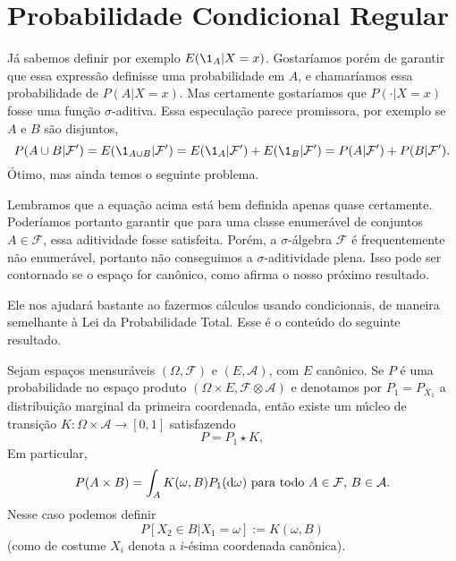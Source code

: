 \section{Probabilidade Condicional Regular}

Já sabemos definir por exemplo $E(\1_A|X = x)$.
Gostaríamos porém de garantir que essa expressão definisse uma probabilidade em $A$, e chamaríamos essa probabilidade de $P(A|X = x)$.
Mas certamente gostaríamos que $P(\cdot|X = x)$ fosse uma função $\sigma$-aditiva.
Essa especulação parece promissora, por exemplo se $A$ e $B$ são disjuntos,
\begin{equation*}
  P(A \cup B |\mathcal{F}') = E(\1_{A \cup B} | \mathcal{F}') = E(\1_A|\mathcal{F}') + E(\1_{B}|\mathcal{F}') = P(A|\mathcal{F}') + P(B|\mathcal{F}').
\end{equation*}
Ótimo, mas ainda temos o seguinte problema.

Lembramos que a equação acima está bem definida apenas quase certamente.
Poderíamos portanto garantir que para uma classe enumerável de conjuntos $A \in \mathcal{F}$, essa aditividade fosse satisfeita.
Porém, a $\sigma$-álgebra $\mathcal{F}$ é frequentemente não enumerável, portanto não conseguimos a $\sigma$-aditividade plena.
Isso pode ser contornado se o espaço for canônico, como afirma o nosso próximo resultado.

Ele nos ajudará bastante ao fazermos cálculos usando condicionais, de maneira semelhante à Lei da Probabilidade Total.
Esse é o conteúdo do seguinte resultado.

\begin{theorem} 
  \label{desintegracao}
  Sejam espaços mensuráveis $(\Omega, \mathcal{F})$ e $(E, \mathcal{A})$, com $E$ canônico.
  Se $P$ é uma probabilidade no espaço produto $(\Omega \times E, \mathcal{F} \otimes \mathcal{A})$ e denotamos por $P_1 = P_{X_1}$ a 
  distribuição marginal da primeira coordenada, então existe um núcleo de transição $K: \Omega \times \mathcal{A} \to [0,1]$ satisfazendo
  \begin{equation}
    P = P_1 \star K,
  \end{equation}
  Em particular,
  \begin{equation}
    \label{e:prob_cond_reg_prod}
    P(A \times B) = \int_A K(\omega, B) P_1 (\mathop{}\!\mathrm{d} \omega) \text{ para todo $A \in \mathcal{F}$, $B \in \mathcal{A}$}.
  \end{equation}
 Nesse caso podemos definir 
 $$P[X_2 \in B | X_1 = \omega]:=K(\omega, B)$$ 
 (como de costume $X_i$ denota a $i$-ésima coordenada canônica).
\end{theorem}

